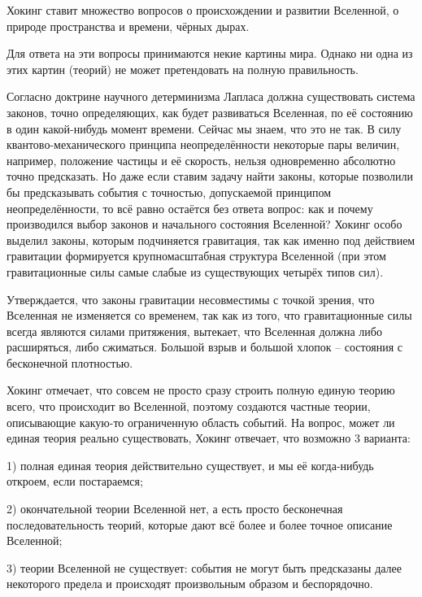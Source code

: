 \documentclass[exam_answers.tex]{subfiles}
\begin{document}
\renewcommand{\baselinestretch}{\blch}

Хокинг ставит множество вопросов о происхождении и развитии Вселенной, о природе пространства и времени, чёрных дырах.

Для ответа на эти вопросы принимаются некие картины мира. Однако ни одна из этих картин (теорий) не может претендовать на полную правильность.

Согласно доктрине научного детерминизма Лапласа должна существовать система законов, точно определяющих, как будет развиваться Вселенная, по её состоянию в один какой-нибудь момент времени.
Сейчас мы знаем, что это не так. В силу квантово-механического принципа неопределённости некоторые пары величин, например, положение частицы и её скорость, нельзя одновременно абсолютно точно предсказать.
Но даже если ставим задачу найти законы, которые позволили бы предсказывать события с точностью, допускаемой принципом неопределённости, то всё равно остаётся без ответа вопрос: как и почему производился выбор законов и начального состояния Вселенной?
Хокинг особо выделил законы, которым подчиняется гравитация, так как именно под действием гравитации формируется крупномасштабная структура Вселенной (при этом гравитационные силы самые слабые из существующих четырёх типов сил).

Утверждается, что законы гравитации несовместимы с точкой зрения, что Вселенная не изменяется со временем, так как из того, что гравитационные силы всегда являются силами притяжения, вытекает, что Вселенная должна либо расширяться, либо сжиматься.
Большой взрыв и большой хлопок – состояния с бесконечной плотностью.

Хокинг отмечает, что совсем не просто сразу строить полную единую теорию всего, что происходит во Вселенной, поэтому создаются частные теории, описывающие какую-то ограниченную область событий.
На вопрос, может ли единая теория реально существовать, Хокинг отвечает, что возможно 3 варианта:

1) полная единая теория действительно существует, и мы её когда-нибудь откроем, если постараемся;

2) окончательной теории Вселенной нет, а есть просто бесконечная последовательность теорий, которые дают всё более и более точное описание Вселенной;

3) теории Вселенной не существует: события не могут быть предсказаны далее некоторого предела и происходят произвольным образом и беспорядочно.
\end{document}
